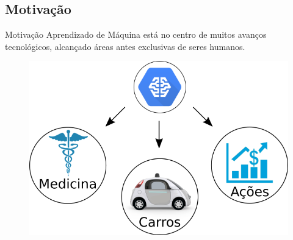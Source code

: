 \documentclass[10pt]{beamer}
\begin{document}
  \subsection{Motivação}
    \begin{frame}[fragile]{Motivação}
    Aprendizado de Máquina está no centro de muitos avanços tecnológicos, alcançado áreas antes exclusivas de seres humanos.
    \begin{figure}[H]
    \begin{center}
        \includegraphics[scale=0.50]{images/machine_learn.png}
    \end{center}
    \end{figure}
    \end{frame}
\end{document}

